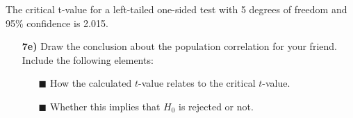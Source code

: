 The critical t-value for a left-tailed one-sided test with 5 degrees of freedom and 95\% confidence is 2.015.

\begin{itemize}

    \item[\textbf{7e)}] Draw the conclusion about the population correlation for your friend. Include the following elements:
    \begin{itemize}
        \item[$\blacksquare$] How the calculated $t$-value relates to the critical $t$-value.
        \item[$\blacksquare$] Whether this implies that $H_0$ is rejected or not.
    \end{itemize}
    
\end{itemize}


\clearpage %